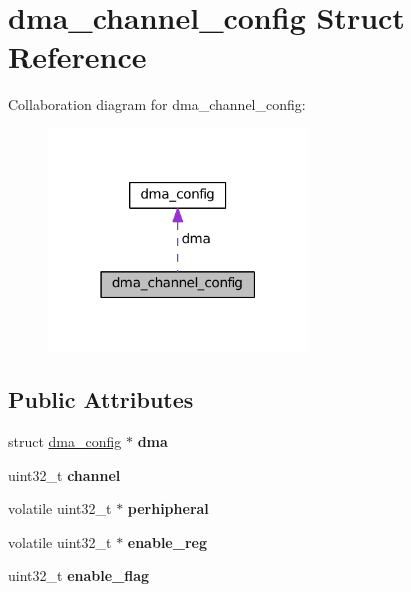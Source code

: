 \hypertarget{structdma__channel__config}{}\section{dma\+\_\+channel\+\_\+config Struct Reference}
\label{structdma__channel__config}


Collaboration diagram for dma\+\_\+channel\+\_\+config\+:\nopagebreak
\begin{figure}[H]
\begin{center}
\leavevmode
\includegraphics[width=195pt]{structdma__channel__config__coll__graph}
\end{center}
\end{figure}
\subsection*{Public Attributes}
\begin{DoxyCompactItemize}
\item 
\hypertarget{structdma__channel__config_a0352048b957404e734bae6df7678ad38}{}struct \hyperlink{structdma__config}{dma\+\_\+config} $\ast$ {\bfseries dma}\label{structdma__channel__config_a0352048b957404e734bae6df7678ad38}

\item 
\hypertarget{structdma__channel__config_a924e6ca6c88d830241be32248294b63e}{}uint32\+\_\+t {\bfseries channel}\label{structdma__channel__config_a924e6ca6c88d830241be32248294b63e}

\item 
\hypertarget{structdma__channel__config_a1502b9f3fb49ee8e7a04ff49ff07e7c1}{}volatile uint32\+\_\+t $\ast$ {\bfseries perhipheral}\label{structdma__channel__config_a1502b9f3fb49ee8e7a04ff49ff07e7c1}

\item 
\hypertarget{structdma__channel__config_ae5a311bdf13af6200280be76472b60a0}{}volatile uint32\+\_\+t $\ast$ {\bfseries enable\+\_\+reg}\label{structdma__channel__config_ae5a311bdf13af6200280be76472b60a0}

\item 
\hypertarget{structdma__channel__config_ab58f12489030ee869dcf457eabf80cd6}{}uint32\+\_\+t {\bfseries enable\+\_\+flag}\label{structdma__channel__config_ab58f12489030ee869dcf457eabf80cd6}

\end{DoxyCompactItemize}


